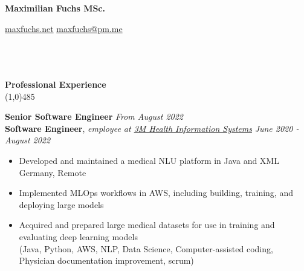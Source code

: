 \documentclass[9pt]{extarticle}
\newcommand\negativespace[1][-0.12cm]{\hspace*{#1}}
\begin{document}
\centerline{{\LARGE \bf Maximilian Fuchs MSc.}}
\centerline{\small \href{https://maxfuchs.net}{maxfuchs.net} \raisebox{0.25ex}{\tiny$\bullet$}  \href{mailto:maxfuchs@pm.me}{maxfuchs@pm.me}}


\noindent %
\\\\\\
\vspace*{-6pt}
{\negativespace \Large \bf Professional Experience}\\
\line(1,0){485}
\\
\noindent

\noindent
{\bf Senior Software Engineer}  \hfill \textit{From August 2022} \\
{\bf Software Engineer}, \textit{employee at \href{https://www.3m.com/3M/en_US/health-information-systems-us/support/international/}{3M Health Information Systems}}  \hfill \textit{June 2020 - August 2022} 
\begin{itemize}
\setlength\itemsep{0.05em}
\item Developed and maintained a medical NLU platform in Java and XML \hfill Germany, Remote 
\item Implemented MLOps workflows in AWS, including building, training, and deploying large models
\item Acquired and prepared large medical datasets for use in training and evaluating deep learning models \\
(Java, Python, AWS, NLP, Data Science, Computer-assisted coding, Physician documentation improvement, scrum) \\
\end{itemize}
\end{document}
